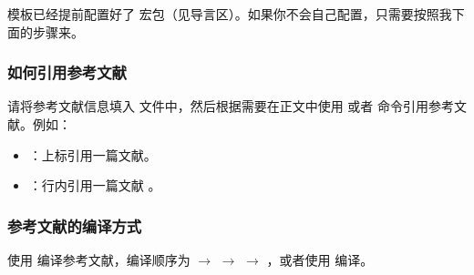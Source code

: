 模板已经提前配置好了  宏包（见导言区）。如果你不会自己配置，只需要按照我下面的步骤来。

\subsubsection{如何引用参考文献}

请将参考文献信息填入  文件中，然后根据需要在正文中使用  或者  命令引用参考文献。例如：
\begin{itemize}
  \item {}：上标引用一篇文献\cite[定理 1]{研究生学位论文开题报告登记表}。

  \item {}：行内引用一篇文献 \parencite[定理 1]{研究生学位论文开题报告登记表}。
\end{itemize}


\subsubsection{参考文献的编译方式}

使用  编译参考文献，编译顺序为  $\to$  $\to$  $\to$ ，或者使用  编译。